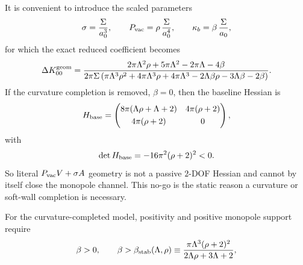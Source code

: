 \documentclass[11pt]{article}
\begin{document}
It is convenient to introduce the scaled parameters
\begin{equation}
\sigma=\frac{\Sigma}{a_0^3},
\qquad
P_{\rm vac}=\rho\,\frac{\Sigma}{a_0^4},
\qquad
\kappa_b=\beta\,\frac{\Sigma}{a_0},
\label{eq:geom-breathing-scaled-params}
\end{equation}
for which the exact reduced coefficient becomes
\begin{equation}
\Delta K_{00}^{\rm geom}
=
\frac{2\pi\Lambda^2\rho+5\pi\Lambda^2-2\pi\Lambda-4\beta}
{2\pi\Sigma\left(\pi\Lambda^3\rho^2+4\pi\Lambda^3\rho+4\pi\Lambda^3-2\Lambda\beta\rho-3\Lambda\beta-2\beta\right)}.
\label{eq:geom-breathing-exact-static-ratio}
\end{equation}
If the curvature completion is removed, \(\beta=0\), then the baseline Hessian is
\begin{equation}
H_{\rm base}
=
\begin{pmatrix}
8\pi(\Lambda\rho+\Lambda+2) & 4\pi(\rho+2)\\[3pt]
4\pi(\rho+2) & 0
\end{pmatrix},
\label{eq:geom-breathing-Hbase}
\end{equation}
with
\begin{equation}
\det H_{\rm base}=-16\pi^2(\rho+2)^2<0.
\label{eq:geom-breathing-Hbase-det}
\end{equation}
So literal \(P_{\rm vac}V+\sigma A\) geometry is not a passive \(2\)-DOF Hessian and
cannot by itself close the monopole channel.
This no-go is the static reason a curvature or soft-wall completion is necessary.

For the curvature-completed model, positivity and positive monopole support require
\begin{equation}
\beta>0,
\qquad
\beta>\beta_{\rm stab}(\Lambda,\rho)
\equiv
\frac{\pi\Lambda^3(\rho+2)^2}{2\Lambda\rho+3\Lambda+2},
\label{eq:geom-breathing-beta-stab}
\end{equation}
\end{document}
